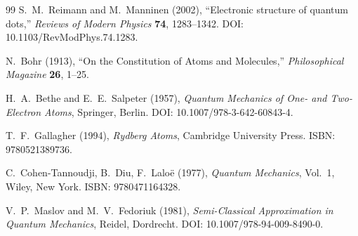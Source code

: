 \documentclass[11pt]{article}
\begin{document}
\begin{thebibliography}{99}
                S.~M.~Reimann and M.~Manninen (2002),
                ``Electronic structure of quantum dots,''
                \emph{Reviews of Modern Physics} \textbf{74}, 1283--1342.
                DOI: 10.1103/RevModPhys.74.1283.

            N.~Bohr (1913),
            ``On the Constitution of Atoms and Molecules,''
            \emph{Philosophical Magazine} \textbf{26}, 1--25.

            H.~A.~Bethe and E.~E.~Salpeter (1957),
            \emph{Quantum Mechanics of One- and Two-Electron Atoms},
            Springer, Berlin.
            DOI: 10.1007/978-3-642-60843-4.

            T.~F.~Gallagher (1994),
            \emph{Rydberg Atoms},
            Cambridge University Press.
            ISBN: 9780521389736.

            C.~Cohen-Tannoudji, B.~Diu, F.~Lalo\"e (1977),
            \emph{Quantum Mechanics}, Vol.~1,
            Wiley, New York.
            ISBN: 9780471164328.


        V.~P.~Maslov and M.~V.~Fedoriuk (1981),
        \emph{Semi-Classical Approximation in Quantum Mechanics},
        Reidel, Dordrecht.
        DOI: 10.1007/978-94-009-8490-0.



            \end{thebibliography}
\end{document}
